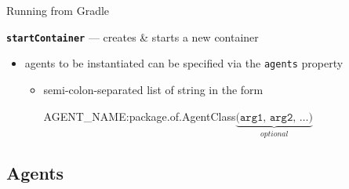 \documentclass{beamer}\mode<presentation>{\usetheme{AMSCesenaPurpleAndGold}}
\begin{document}
\begin{frame}[allowframebreaks]{Running \jade{} from Gradle}
\begin{block}{\textbf{\texttt{startContainer}} --- creates \& starts a new container}
\begin{itemize}
            \item agents to be instantiated can be specified via the \alert{\texttt{agents}} property
            \begin{itemize}
                \item semi-colon-separated list of string in the form
                \begin{center}\ttfamily
                    AGENT\_NAME\alert{:}package.of.AgentClass$\underbrace{\texttt{(arg1, arg2, \ldots)}}_{optional}$
                \end{center}
            \end{itemize}
        \end{itemize}
    \end{block}
\end{frame}

\subsection{\jade{} Agents}
\end{document}
